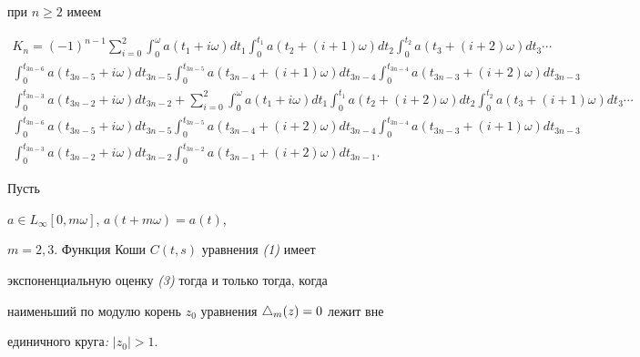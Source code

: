 при $n\ge2$ имеем


\begin{gather*}


K_n=(-1)^{n-1}\sum_{i=0}^2


\int_0^{\omega}a(t_1+i\omega)dt_1


\int_0^{t_1}a(t_2+(i+1)\omega)dt_2\int_0^{t_2}a(t_3+(i+2)\omega)dt_3\dotsb\\


%


\int_0^{t_{3n-6}}a(t_{3n-5}+i\omega)dt_{3n-5}\int_0^{t_{3n-5}}a(t_{3n-4}+


(i+1)\omega)dt_{3n-4}\int_0^{t_{3n-4}}a(t_{3n-3}+(i+2)\omega)dt_{3n-3}\\


%


\int_0^{t_{3n-3}}a(t_{3n-2}+i\omega)dt_{3n-2}+


\sum_{i=0}^2


\int_0^{\omega}a(t_1+i\omega)dt_1


\int_0^{t_1}a(t_2+(i+2)\omega)dt_2\int_0^{t_2}a(t_3+(i+1)\omega)dt_3\dotsb\\


%


\int_0^{t_{3n-6}}a(t_{3n-5}+i\omega)dt_{3n-5}\int_0^{t_{3n-5}}a(t_{3n-4}+


(i+2)\omega)dt_{3n-4}\int_0^{t_{3n-4}}a(t_{3n-3}+(i+1)\omega)dt_{3n-3}\\


%


\int_0^{t_{3n-3}}a(t_{3n-2}+i\omega)dt_{3n-2}


\int_0^{t_{3n-2}}a(t_{3n-1}+(i+2)\omega)


dt_{3n-1}.


\end{gather*}





\begin{thmnonum} Пусть


$a\in L_\infty[0,m\omega]$, $a(t+m\omega)=a(t)$,


$m=2,3$. Функция Коши $C(t,s)$ уравнения {\em (1)} имеет


экспоненциальную оценку {\em (3)} тогда и только тогда, когда


наименьший по модулю корень $z_0$ уравнения $\triangle_m(z)=0$ лежит вне


единичного круга{\em :} $|z_0|>1$.


\end{thmnonum}





